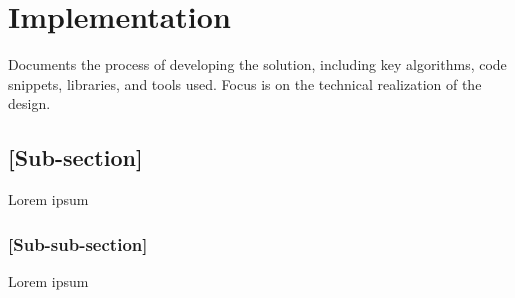 \chapter{Implementation} 

Documents the process of developing the solution, including key algorithms, code snippets, libraries, and tools used. Focus is on the technical realization of the design. 

\section{[Sub-section]} Lorem ipsum 
\subsection{[Sub-sub-section]} Lorem ipsum